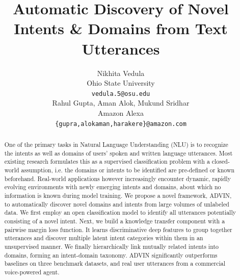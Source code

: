 \documentclass[11pt]{article}
\title{Automatic Discovery of Novel Intents \& Domains from Text Utterances}
\author{Nikhita Vedula \\
  Ohio State University \\
  {\tt vedula.5@osu.edu} \\\And
  Rahul Gupta, Aman Alok, Mukund Sridhar \\
  Amazon Alexa \\
  {\tt \{gupra,alokaman,harakere\}@amazon.com} 
  \\}
\begin{document}
\maketitle

\begin{abstract}

One of the primary tasks in Natural Language Understanding (NLU) is to recognize the intents as well as domains of users' spoken and written language utterances. Most existing research formulates this as a supervised classification problem with a closed-world assumption, i.e. the domains or intents to be identified are pre-defined or known beforehand. Real-world applications however increasingly encounter dynamic, rapidly evolving environments with newly emerging intents and domains, about which no information is known during model training. We propose a novel framework, ADVIN, to automatically discover novel domains and intents from large volumes of unlabeled data. We first employ an open classification model to identify all utterances potentially consisting of a novel intent. Next, we build a knowledge transfer component with a pairwise margin loss function. It learns discriminative deep features to group together utterances and discover multiple latent intent categories within them in an unsupervised manner. We finally hierarchically link mutually related intents into domains, forming an intent-domain taxonomy. ADVIN significantly outperforms baselines on three benchmark datasets, and real user utterances from a commercial voice-powered agent. 

\end{abstract}











\begin{small}


\fontsize{9.0pt}{10.0pt}
\selectfont
\end{small}
\end{document}
